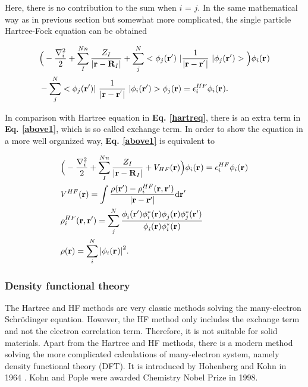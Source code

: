 \documentclass[a4paper, 12pt, titlepage,oneside,drop]{kthesis}
\begin{document}
Here, there is no contribution to the sum when $i$ = $j$. In the same mathematical way as in previous section but somewhat more complicated, the single particle Hartree-Fock equation can be obtained

\begin{equation}\begin{split}\label{above1}
& \Big( -\frac{\nabla^{2}_{i}}{2} + \sum\limits_I^{{Nn}} \frac{Z_{I}}{|\textbf{r}-\textbf{R}_{I}|} + \sum\limits_{j}^{{N}} <\bwfn<j><'>\ | \frac{1}{|\textbf{r} - \textbf{r}^{'} |} \ | \bwfn<j><'>> \Big) \bwff<i><>  \\
& - \sum\limits_{j}^{{N}}  < \bwfn<j><'>|\ \frac{1}{|\textbf{r} - \textbf{r}^{'} |} \ | \bwfn<i><'> > \bwfn<j><>  = \epsilon_{i}^{{HF}} \bwff<i><>.
\end{split}\end{equation}

In comparison with Hartree equation in \textbf{Eq. \ref{hartreq}}, there is an extra term in \textbf{Eq. \ref{above1}}, which is so called exchange term. In order to show the equation in a more well organized way,
\textbf{Eq. \ref{above1}} is equivalent to

\begin{equation}\label{aaaaa}\begin{split}
& \Big( -\frac{\nabla^{2}_{i}}{2} +  \sum\limits_I^{{Nn}} \frac{Z_{I}}{|\textbf{r}-\textbf{R}_{I}|} +V_{HF}(\textbf{r}) \Big)  \bwff<i><>  = \epsilon_{i}^{{HF}}   \bwff<i><> \\
&  V^{HF}(\textbf{r})= \int \frac{\rho(\textbf{r}{'}) - \rho_{{i}}^{{HF}}(\textbf{r},\textbf{r}{'})}{|\textbf{r} - \textbf{r}{'} |}  \mathrm{d}\textbf{r}{'} \\
& \rho_{{i}}^{{HF}}(\textbf{r},\textbf{r}{'}) = \sum\limits_j^N \frac{\phi_{i}^{}(\textbf{r}{'}) \phi_{i}^{*}(\textbf{r}{}) \phi_{j}^{}(\textbf{r}{}) \phi_{j}^{*}(\textbf{r}{'})} {\phi_{i}^{}(\textbf{r}) \phi_{i}^{*}(\textbf{r})}  \\
& \rho(\textbf{r}) = \sum\limits_i^N  {|\bwff<i><>|}^{2}.
\end{split}
\end{equation}


\subsubsection{Density functional theory}
The Hartree and HF methods are very classic methods solving the many-electron Schrödinger equation. However, the HF method only includes the exchange term and not the electron correlation term. Therefore, it is not suitable 
for solid materials. Apart from the Hartree and HF methods, there is a modern method solving the more complicated calculations of many-electron system, namely density functional theory (DFT). 
It is introduced by Hohenberg and Kohn in 1964 \cite{hohenberg1964inhomogeneous}. Kohn and Pople were awarded Chemistry Nobel Prize in 1998.
\end{document}
